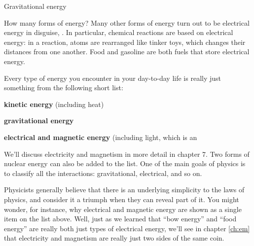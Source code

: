 \begin{envsubsection}{Gravitational energy}
\begin{envsubsection}{How many forms of energy?}
 Many other forms
of energy turn out to be electrical energy in disguise, . In particular, chemical reactions are based on
electrical energy: in a reaction, atoms are rearranged like tinker toys, which changes their
distances from one another. Food and gasoline are both fuels that store
electrical energy.

Every type of energy you encounter in your day-to-day life is really
just something from the following short list:

\newcommand{\energylistitem}[2]{\hspace{4mm}\textbf{#1} #2}

\noindent\energylistitem{kinetic energy}{(including heat)}

\noindent\energylistitem{gravitational energy}{}

\noindent\energylistitem{electrical and magnetic energy}{(including light, which is an}\\

\noindent We'll discuss electricity and magnetism in more detail in chapter 7. Two forms of nuclear
energy can also be added to the list.
 One of the main goals of physics is to
classify all the interactions: gravitational, electrical, and so on. 


Physicists
generally believe that there is an underlying simplicity to the laws of physics, and
consider it a triumph when they can reveal part of it. You might wonder, for instance,
why electrical and magnetic energy are shown as a single item on the list above. Well,
just as we learned that ``bow energy'' and ``food energy'' are really both just types of
electrical energy, we'll see in chapter \ref{ch:em} that electricity and magnetism are really
just two sides of the same coin.\label{introunificationofforces}
\end{envsubsection}


\end{envsubsection}
